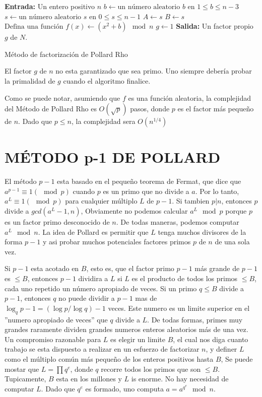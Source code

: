    \begin{algorithm}[H]
        \SetAlgoLined
        \textbf{Entrada:} Un entero positivo $n$\;
        $b \leftarrow \text{un número aleatorio $b$ en } 1 \leq b \leq n-3$\;
        $s \leftarrow \text{un número aleatorio $s$ en } 0 \leq s \leq n-1$\;
        $A \leftarrow s$\;
        $B \leftarrow s$\;
        $\text{Defina una función } f(x) \leftarrow (x^{2} + b) \mod n$\;
        $g \leftarrow 1$\;
        \textbf{Salida:} Un factor propio $g$ de $N$.\ 
        \caption{Método de factorización de Pollard Rho}
    \end{algorithm}

    El factor $g$ de $n$ no esta garantizado que sea primo. Uno siempre debería probar la primalidad de $g$ cuando el algoritmo finalice.

    Como se puede notar, asumiendo que $f$ es una función aleatoria, la complejidad del Método de Pollard Rho es $O(\sqrt{p})$ pasos, donde $p$ es el factor más pequeño de $n$. Dado que $p \leq n$, la complejidad sera $O(n^{1/4})$

    \section{MÉTODO p-1 DE POLLARD}
    El método $p-1$ esta basado en el pequeño teorema de Fermat, que dice que $a^{p-1} \equiv 1 (\mod p)$ cuando $p$ es un primo que no divide a $a$. Por lo tanto, $a^L \equiv 1 (\mod p)$ para cualquier múltiplo $L$ de $p-1$. Si tambien $p | n$, entonces $p$ divide a $gcd(a^{L}-1, n)$, Obviamente no podemos calcular $a^{L} \mod p$ porque $p$ es un factor primo desconocido de $n$. De todas maneras, podemos computar $a^{L} \mod n$. La idea de Pollard es permitir que $L$ tenga muchos divisores de la forma $p-1$ y asi probar muchos potenciales factores primos $p$ de $n$ de una sola vez.

    Si $p-1$ esta acotado en $B$, esto es, que el factor primo $p-1$ más grande de $p-1$ es $\leq B$, entonces $p-1$ dividira a $L$ si $L$ es el producto de todos los primos $\leq B$, cada uno repetido un número apropiado de veces. Si un primo $q \leq B$ divide a $p-1$, entonces $q$ no puede dividir a $p-1$ mas de $\log_{q}p-1 = (\log p/\log q)-1$ veces. Este numero es un limite superior en el ''numero apropiado de veces'' que $q$ divide a $L$. De todas formas, primes muy grandes raramente dividen grandes numeros enteros aleatorios más de una vez. Un compromiso razonable para $L$ es elegir un limite $B$, el cual nos diga cuanto trabajo se esta dispuesto a realizar en un esfuerzo de factorizar $n$, y definer $L$ como el múltiplo común más pequeño de los enteros positivos hasta $B$, Se puede mostar que $L = \prod{q^{e}}$, donde $q$ recorre todos los primos que son $\leq B$. Tupicamente, $B$ esta en los millones y $L$ is enorme. No hay necesidad de computar $L$. Dado que $q^{e}$ es formado, uno computa $a = a^{q^{e}} \mod n$. \citep{Pollard1974}
    
